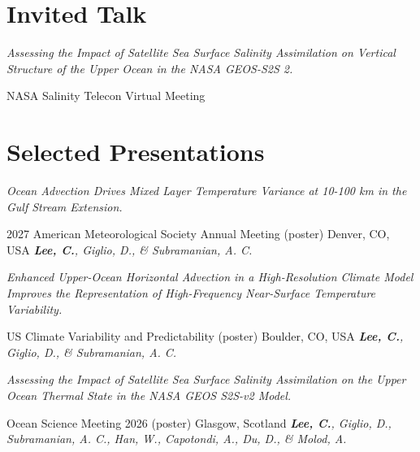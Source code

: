 \documentclass[11pt,usletter,sans]{moderncv}
\begin{document}
\section{Invited Talk}
    
        {\parbox[t]{0.8\textwidth}{\textit{Assessing the Impact of Satellite Sea Surface Salinity Assimilation on Vertical Structure of the Upper Ocean in the NASA GEOS-S2S 2.}}}
        {NASA Salinity Telecon}      %
        {Virtual Meeting}             %
        {}                           %
        {}                           %

\section{Selected Presentations}
        {\parbox[t]{0.78\textwidth}{\textit{Ocean Advection Drives Mixed Layer Temperature Variance at 10-100 km in the Gulf Stream Extension.}}}
        {2027 American Meteorological Society Annual Meeting (poster)}   %
        {Denver, CO, USA}           %
        {}
        {}
        {\emph{\textbf{Lee, C.}, Giglio, D., \& Subramanian, A. C.}}
        
\vspace{0.8em}

        {\parbox[t]{0.78\textwidth}{\textit{Enhanced Upper-Ocean Horizontal Advection in a High-Resolution Climate Model Improves the Representation of High-Frequency Near-Surface Temperature Variability.}}}
        {US Climate Variability and Predictability (poster)}   %
        {Boulder, CO, USA}           %
        {}
        {}
        {\emph{\textbf{Lee, C.}, Giglio, D., \& Subramanian, A. C.}}
        
\vspace{0.8em}

        {\parbox[t]{0.8\textwidth}{\textit{Assessing the Impact of Satellite Sea Surface Salinity Assimilation on the Upper Ocean Thermal State in the NASA GEOS S2S-v2 Model.}}}
        {Ocean Science Meeting 2026 (poster)}   %
        {Glasgow, Scotland}           %
        {}
        {}
        {\emph{\textbf{Lee, C.}, Giglio, D., Subramanian, A. C., Han, W., Capotondi, A., Du, D., \& Molod, A.}}
        
\end{document}

